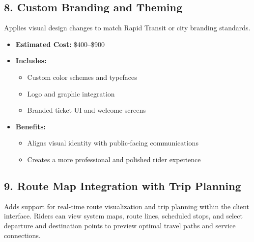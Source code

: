 \documentclass[12pt]{article}
\begin{document}
\subsection*{8. Custom Branding and Theming}

Applies visual design changes to match Rapid Transit or city branding standards.

\begin{itemize}
    \item \textbf{Estimated Cost:} \$400–\$900
    \item \textbf{Includes:}
    \begin{itemize}
        \item Custom color schemes and typefaces
        \item Logo and graphic integration
        \item Branded ticket UI and welcome screens
    \end{itemize}
    \item \textbf{Benefits:}
    \begin{itemize}
        \item Aligns visual identity with public-facing communications
        \item Creates a more professional and polished rider experience
    \end{itemize}
\end{itemize}

\subsection*{9. Route Map Integration with Trip Planning}

Adds support for real-time route visualization and trip planning within the client interface. Riders can view system maps, route lines, scheduled stops, and select departure and destination points to preview optimal travel paths and service connections.
\end{document}
